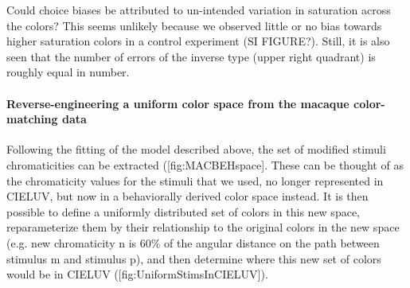 
Could choice biases be attributed to un-intended variation in saturation across the colors? This seems unlikely because we observed little or no bias towards higher saturation colors in a control experiment (SI FIGURE?). Still, it is also seen that the number of errors of the inverse type (upper right quadrant) is roughly equal in number.

\paragraph{Reverse-engineering a uniform color space from the macaque color-matching data }

Following the fitting of the model described above, the set of modified stimuli chromaticities can be extracted ([fig:MACBEHspace]. These can be thought of as the chromaticity values for the stimuli that we used, no longer represented in CIELUV, but now in a behaviorally derived color space instead. It is then possible to define a uniformly distributed set of colors in this new space, reparameterize them by their relationship to the original colors in the new space (e.g. new chromaticity n is 60\% of the angular distance on the path between stimulus m and stimulus p), and then determine where this new set of colors would be in CIELUV ([fig:UniformStimsInCIELUV]).